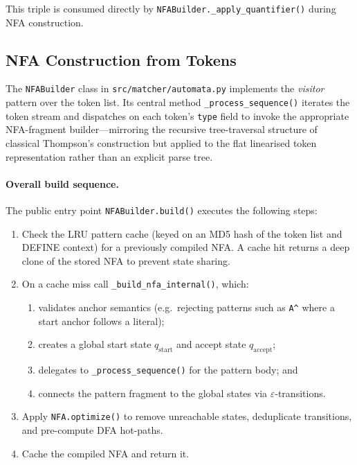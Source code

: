 \noindent This triple is consumed directly by
\texttt{NFABuilder.\_apply\_quantifier()} during NFA construction.

\subsection{NFA Construction from Tokens}
\label{subsec:meth-nfa-from-tokens}

The \texttt{NFABuilder} class in \texttt{src/matcher/automata.py}
implements the \emph{visitor} pattern over the token list.  Its
central method \texttt{\_process\_sequence()} iterates the token
stream and dispatches on each token's \texttt{type} field to invoke
the appropriate NFA-fragment builder—mirroring the recursive
tree-traversal structure of classical Thompson's construction but
applied to the flat linearised token representation rather than an
explicit parse tree.

\paragraph{Overall build sequence.}
The public entry point \texttt{NFABuilder.build()} executes the
following steps:

\begin{enumerate}
  \item Check the LRU pattern cache (keyed on an MD5 hash of the
    token list and DEFINE context) for a previously compiled NFA.
    A cache hit returns a deep clone of the stored NFA to prevent
    state sharing.
  \item On a cache miss call \texttt{\_build\_nfa\_internal()}, which:
    \begin{enumerate}[label=(\alph*)]
      \item validates anchor semantics (e.g.\ rejecting patterns such
        as \texttt{A\^{}} where a start anchor follows a literal);
      \item creates a global start state $q_\text{start}$ and accept
        state $q_\text{accept}$;
      \item delegates to \texttt{\_process\_sequence()} for the
        pattern body; and
      \item connects the pattern fragment to the global states via
        $\varepsilon$-transitions.
    \end{enumerate}
  \item Apply \texttt{NFA.optimize()} to remove unreachable states,
    deduplicate transitions, and pre-compute DFA hot-paths.
  \item Cache the compiled NFA and return it.
\end{enumerate}

